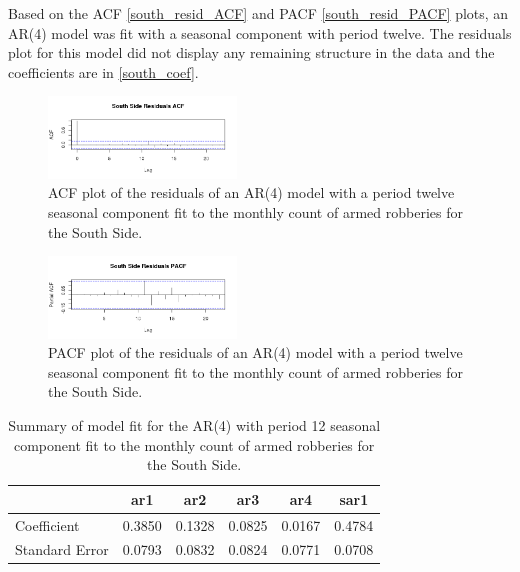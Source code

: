 \documentclass{article} %
\begin{document}
\noindent Based on the ACF \autoref{south_resid_ACF} and PACF \autoref{south_resid_PACF} plots, an AR(4) model was fit with a seasonal component with period twelve. The residuals plot for this model did not display any remaining structure in the data and the coefficients are in \autoref{south_coef}.\newline\newline 

\begin{multicols}{2}
\begin{figure}[H]
\includegraphics[width=50mm]{Plots/south_resid_ACF.png}
\caption{ACF plot of the residuals of an AR(4) model with a period twelve seasonal component fit to the monthly count of armed robberies for the South Side.}
\label{south_resid_ACF}
\end{figure}

\begin{figure}[H]
\includegraphics[width=50mm]{Plots/south_resid_PACF.png}
\caption{PACF plot of the residuals of an AR(4) model with a period twelve seasonal component fit to the monthly count of armed robberies for the South Side.}
\end{figure}
\label{south_resid_PACF}
\end{multicols}


\begin{table}[h]
	\label{tab:data}
	\begin{center}
	\begin{tabular}{lccccc}
			\hline
			  & ar1 &    ar2 &    ar3 &    ar4 &   sar1 \\ \hline
			Coefficient & 0.3850 & 0.1328 & 0.0825  & 0.0167 & 0.4784  \\
			Standard Error &   0.0793 & 0.0832&  0.0824 & 0.0771  &0.0708   \\
		\end{tabular}
	\caption{Summary of model fit for the AR(4) with period 12 seasonal component fit to the monthly count of armed robberies for the South Side.}
	\end{center}
	\label{south_coef}
\end{table}
\end{document}
